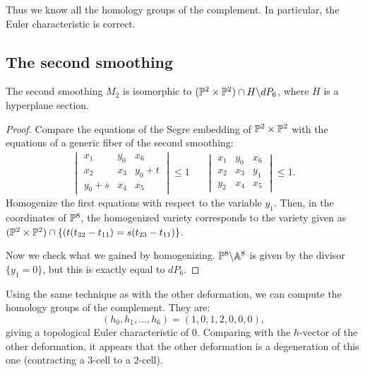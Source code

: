 \documentclass[11pt, english]{article}
\begin{document}
Thus we know all the homology groups of the complement. In particular, the Euler characteristic is correct.

\subsection{The second smoothing}

\begin{prop}
The second smoothing $M_2$ is isomorphic to $(\mathbb{P}^2 \times \mathbb{P}^2) \cap H \backslash dP_6$, where $H$ is a hyperplane section.
\end{prop}
\begin{proof}
Compare the equations of the Segre embedding of $\mathbb{P}^2 \times \mathbb{P}^2$ with the equations of a generic fiber of the second smoothing:
\begin{align*}
\begin{vmatrix}
x_1 & y_0 & x_6 \\
x_2 & x_3 & y_0+t \\
y_0+s & x_4 & x_5
\end{vmatrix} \le 1
&&
\begin{vmatrix}
x_1 & y_0 & x_6 \\
x_2 & x_3 & y_1 \\
y_2 & x_4 & x_5
\end{vmatrix} \le 1.
\end{align*}
Homogenize the first equations with respect to the variable $y_1$. Then, in the coordinates of $\mathbb{P}^8$, the homogenized variety corresponds to the variety given as $(\mathbb{P}^2 \times \mathbb{P}^2) \cap \{ (t(t_{32}-t_{11})=s(t_{23}-t_{11}) \}$.

Now we check what we gained by homogenizing. $\mathbb{P}^8 \backslash \mathbb{A}^8$ is given by the divisor $\{ y_1 = 0 \}$, but this is exactly equal to $dP_6$.
\end{proof}

Using the same technique as with the other deformation, we can compute the homology groups of the complement. They are:
$$
(h_0,h_1,\ldots,h_6)=(1,0,1,2,0,0,0),
$$
giving a topological Euler characteristic of $0$. Comparing with the $h$-vector of the other deformation, it appears that the other deformation is a degeneration of this one (contracting a 3-cell to a 2-cell).





\end{document}
